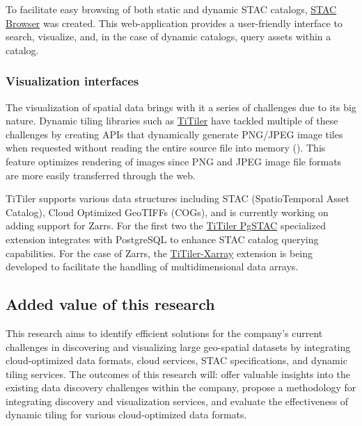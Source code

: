 \documentclass[
  oneside,
  open=any]{scrbook}
\begin{document}
To facilitate easy browsing of both static and dynamic STAC catalogs,
\href{https://github.com/radiantearth/stac-browser}{STAC Browser} was
created. This web-application provides a user-friendly interface to
search, visualize, and, in the case of dynamic catalogs, query assets
within a catalog.

\subsubsection*{Visualization
interfaces}\label{visualization-interfaces}

The visualization of spatial data brings with it a series of challenges
due to its big nature. Dynamic tiling libraries such as
\href{https://developmentseed.org/titiler/}{TiTiler} have tackled
multiple of these challenges by creating APIs that dynamically generate
PNG/JPEG image tiles when requested without reading the entire source
file into memory
(). This
feature optimizes rendering of images since PNG and JPEG image file
formats are more easily transferred through the web.

TiTiler supports various data structures including STAC (SpatioTemporal
Asset Catalog), Cloud Optimized GeoTIFFs (COGs), and is currently
working on adding support for Zarrs. For the first two the
\href{https://github.com/stac-utils/titiler-pgstac}{TiTiler PgSTAC}
specialized extension integrates with PostgreSQL to enhance STAC catalog
querying capabilities. For the case of Zarrs, the
\href{https://github.com/developmentseed/titiler-xarray}{TiTiler-Xarray}
extension is being developed to facilitate the handling of
multidimensional data arrays.

\subsection{Added value of this
research}\label{added-value-of-this-research}

This research aims to identify efficient solutions for the company's
current challenges in discovering and visualizing large geo-spatial
datasets by integrating cloud-optimized data formats, cloud services,
STAC specifications, and dynamic tiling services. The outcomes of this
research will: offer valuable insights into the existing data discovery
challenges within the company, propose a methodology for integrating
discovery and visualization services, and evaluate the effectiveness of
dynamic tiling for various cloud-optimized data formats.
\end{document}
